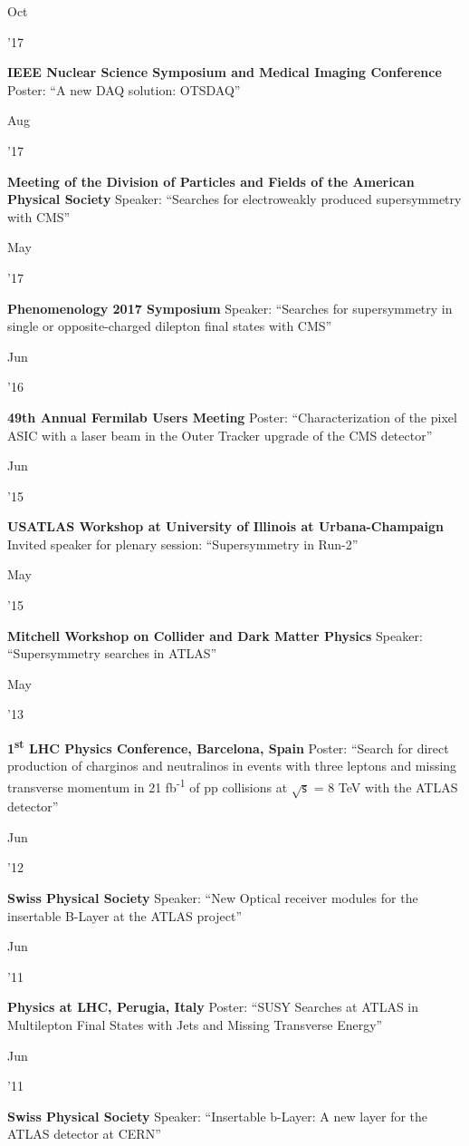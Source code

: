 \documentclass[]{cv} %
\begin{document}
\begin{entrylist}

  \entry
  {\parbox[t]{\parboxWidthOne}{Oct}\parbox[t]{\parboxWidthTwo}{\hfill '17}}
  {\textbf{IEEE Nuclear Science Symposium and Medical Imaging Conference}}
  {}
  {Poster: ``A new DAQ solution: OTSDAQ''}

  \entry
  {\parbox[t]{\parboxWidthOne}{Aug}\parbox[t]{\parboxWidthTwo}{\hfill '17}}
  {\textbf{Meeting of the Division of Particles and Fields of the American Physical Society}}
  {}
  {Speaker: ``Searches for electroweakly produced supersymmetry with CMS''}

  \entry
  {\parbox[t]{\parboxWidthOne}{May}\parbox[t]{\parboxWidthTwo}{\hfill '17}}
  {\textbf{Phenomenology 2017 Symposium}}
  {}
  {Speaker: ``Searches for supersymmetry in single or opposite-charged dilepton final states with CMS''}

  \entry
  {\parbox[t]{\parboxWidthOne}{Jun}\parbox[t]{\parboxWidthTwo}{\hfill '16}}
  {\textbf{49th Annual Fermilab Users Meeting}}
  {}
  {Poster: ``Characterization of the pixel ASIC with a laser beam in the Outer Tracker upgrade of the CMS detector''}

  \entry
  {\parbox[t]{\parboxWidthOne}{Jun}\parbox[t]{\parboxWidthTwo}{\hfill '15}}
  {\textbf{USATLAS Workshop at University of Illinois at Urbana-Champaign}}
  {}
  {Invited speaker for plenary session: ``Supersymmetry in Run-2''}

  \entry
  {\parbox[t]{\parboxWidthOne}{May}\parbox[t]{\parboxWidthTwo}{\hfill '15}}
  {\textbf{Mitchell Workshop on Collider and Dark Matter Physics}}
  {\href{}{}}
  {Speaker: ``Supersymmetry searches in ATLAS''}

  \entry
  {\parbox[t]{\parboxWidthOne}{May}\parbox[t]{\parboxWidthTwo}{\hfill '13}}
  {\textbf{1\textsuperscript{st} LHC Physics Conference, Barcelona, Spain}}
  {}
  {Poster: ``Search for direct production of charginos and neutralinos in events with three
    leptons and missing transverse momentum in 21 fb\textsuperscript{-1} of pp collisions at $\sqrt{\mathsf{s}}$ = 8 TeV with the ATLAS
  detector''}

  \entry
  {\parbox[t]{\parboxWidthOne}{Jun}\parbox[t]{\parboxWidthTwo}{\hfill '12}}
  {\textbf{Swiss Physical Society}}
  {}
  {Speaker: ``New Optical receiver modules for the insertable B-Layer at the ATLAS project''}

  \entry
  {\parbox[t]{\parboxWidthOne}{Jun}\parbox[t]{\parboxWidthTwo}{\hfill '11}}
  {\textbf{Physics at LHC, Perugia, Italy}}
  {}
  {Poster: ``SUSY Searches at ATLAS in Multilepton Final States with Jets and Missing Transverse Energy''}

  \entry
  {\parbox[t]{\parboxWidthOne}{Jun}\parbox[t]{\parboxWidthTwo}{\hfill '11}}
  {\textbf{Swiss Physical Society}}
  {}
  {Speaker: ``Insertable b-Layer: A new layer for the ATLAS detector at CERN''}

\end{entrylist}
\end{document}
